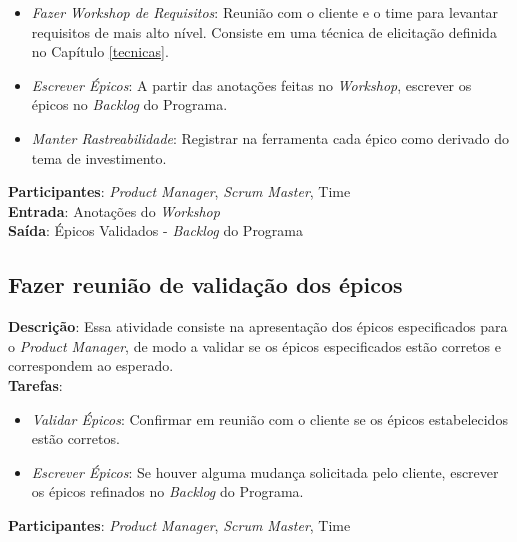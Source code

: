   \begin{itemize}
   \item \indent \textit{Fazer Workshop de Requisitos}: Reunião com o cliente e o time para levantar requisitos de mais alto nível. Consiste
   em uma técnica de elicitação definida no Capítulo \ref{tecnicas}.

   \item \indent \textit{Escrever Épicos}: A partir das anotações feitas no \textit{Workshop},
   escrever os épicos no \textit{Backlog} do Programa.
   
   \item \indent \textit{Manter Rastreabilidade}: Registrar na ferramenta cada épico como derivado do tema de investimento.

  \end{itemize}

  \textbf{Participantes}: \textit{Product Manager}, \textit{Scrum Master}, Time \\

  \textbf{Entrada}: Anotações do \textit{Workshop} \\

  \textbf{Saída}: Épicos Validados - \textit{Backlog} do Programa\\

\subsection{Fazer reunião de validação dos épicos}
  \textbf{Descrição}: Essa atividade consiste na apresentação dos épicos especificados para o \textit{Product Manager}, de modo a validar se os épicos
  especificados estão corretos e correspondem ao esperado. \\

  \textbf{Tarefas}:

  \begin{itemize}
    \item \indent \textit{Validar Épicos}: Confirmar em reunião com o cliente se os épicos estabelecidos estão corretos.

   \item \indent \textit{Escrever Épicos}: Se houver alguma mudança solicitada pelo cliente, escrever os épicos
   refinados no \textit{Backlog} do Programa.
  \end{itemize}

  \textbf{Participantes}: \textit{Product Manager}, \textit{Scrum Master}, Time \\

